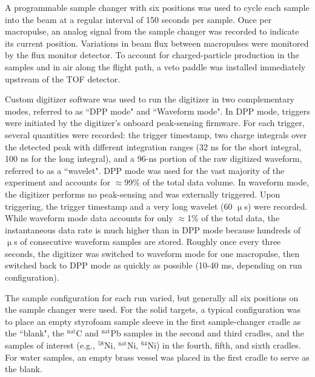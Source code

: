 A programmable sample changer with six positions
was used to cycle each sample into the beam at a regular interval of 150 seconds 
per sample. Once per macropulse, an analog signal from the sample changer was recorded to 
indicate its current position. Variations in beam flux 
between macropulses were monitored by the flux monitor detector. To account for
charged-particle production in the samples and in air along the flight path, a
veto paddle was installed immediately upstream of the TOF detector.

Custom digitizer software was used to run the 
digitizer in two complementary modes, referred to as ``DPP mode" and ``Waveform 
mode". In DPP mode, triggers were initiated by the digitizer's onboard
peak-sensing firmware. For each trigger, several quantities were recorded: the trigger 
timestamp, two charge integrals over the detected peak with different
integration ranges (32 ns for the short integral, 100 ns for the long integral),
and a 96-ns portion of the raw digitized waveform, referred to as a ``wavelet".
DPP mode was used for the vast majority of the 
experiment and accounts for $\approx$99\% of the total data volume. In waveform mode, 
the digitizer performs no peak-sensing and was externally triggered. Upon 
triggering, the trigger timestamp and a very long wavelet (60 $\upmu$s) 
were recorded. While waveform mode data accounts for only $\approx$1\% of the total data, 
the instantaneous data rate is much higher than in DPP 
mode because hundreds of $\upmu$s of consecutive waveform samples are 
stored. Roughly once every three seconds, the digitizer was switched to 
waveform mode for one macropulse, then switched back to DPP mode as quickly as
possible (10-40 ms, depending on run configuration).  

The sample configuration for each run varied, but generally all six positions on
the sample changer were used. For the solid targets, a typical configuration was
to place an empty styrofoam sample sleeve in the first sample-changer cradle as
the ``blank", the $^{\text{nat}}$C and $^{\text{nat}}$Pb samples in the second and third
cradles, and the samples of interest (e.g., $^{58}$Ni, $^{\text{nat}}$Ni, $^{64}$Ni) in
the fourth, fifth, and sixth cradles. For water samples, an empty brass vessel
was placed in the first cradle to serve as the blank.

